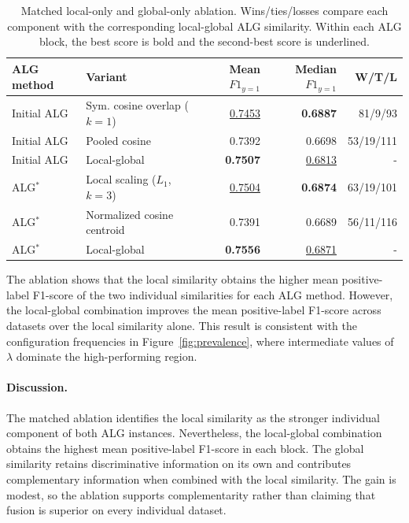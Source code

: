 \documentclass[preprint,12pt]{elsarticle}
\begin{document}
\begin{table}[!htbp]
\centering
\caption{Matched local-only and global-only ablation. Wins/ties/losses compare
each component with the corresponding local-global ALG similarity. Within each
ALG block, the best score is bold and the second-best score is underlined.}
\label{tab:ablation}
\small
\begin{tabularx}{\linewidth}{lXrrr}
\toprule
ALG method & Variant & Mean $F1_{y=1}$ & Median $F1_{y=1}$ & W/T/L\\
\midrule
Initial ALG & Sym. cosine overlap ($k=1$) & \underline{0.7453} & \textbf{0.6887} & 81/9/93\\
Initial ALG & Pooled cosine & 0.7392 & 0.6698 & 53/19/111\\
Initial ALG & Local-global & \textbf{0.7507} & \underline{0.6813} & -\\
\midrule
ALG$^*$ & Local scaling ($L_1$, $k=3$) & \underline{0.7504} & \textbf{0.6874} & 63/19/101\\
ALG$^*$ & Normalized cosine centroid & 0.7391 & 0.6689 & 56/11/116\\
ALG$^*$ & Local-global & \textbf{0.7556} & \underline{0.6871} & -\\
\bottomrule
\end{tabularx}
\end{table}

The ablation shows that the local similarity obtains the higher mean
positive-label F1-score of the two individual similarities for each ALG method.
However, the local-global combination improves the mean positive-label
F1-score across datasets over the local similarity alone. This result is consistent with the
configuration frequencies in Figure~\ref{fig:prevalence}, where intermediate
values of $\lambda$ dominate the high-performing region.

\paragraph{Discussion.}
The matched ablation identifies the local similarity as the stronger individual
component of both ALG instances. Nevertheless, the local-global combination
obtains the highest mean positive-label F1-score in each block. The global similarity retains discriminative information on its own and
contributes complementary information when combined with the local similarity. The gain is modest, so the ablation
supports complementarity rather than claiming that fusion is superior on every
individual dataset.
\end{document}
